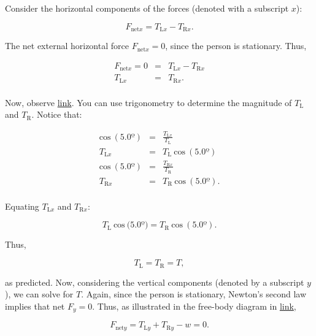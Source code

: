 \documentclass[
]{book}
\begin{document}
Consider the horizontal components of the forces (denoted with a
subscript \(x{}\)):

\leavevmode{}%
\[{F_{\text{net}x} = {T_{\text{L}x} - T_{\text{R}x}}}.\]

The net external horizontal force \({F_{\text{net}x} = 0}{}\), since the
person is stationary. Thus,

\leavevmode{}%
\[\begin{array}{lll}
{F_{\text{net}x} = 0} & = & {T_{\text{L}x} - T_{\text{R}x}} \\
T_{\text{L}x} & = & {T_{\text{R}x}.} \\
\end{array}{}\]

Now, observe \protect\hyperlink{import-auto-id1561864}{link}. You
can use trigonometry to determine the magnitude of \(T_{\text{L}}{}\) and
\(T_{\text{R}}{}\). Notice that:

\leavevmode{}%
\[\begin{array}{lll}
{\text{cos}\ (5.0º)} & = & \frac{T_{\text{L}x}}{T_{\text{L}}} \\
T_{\text{L}x} & = & {T_{\text{L}}\ \text{cos}\ (5.0º)} \\
{\text{cos}\ (5.0º)} & = & \frac{T_{\text{R}x}}{T_{\text{R}}} \\
T_{\text{R}x} & = & {T_{\text{R}}\ \text{cos}\ (5.0º).} \\
\end{array}\]

Equating \(T_{\text{L}x}{}\) and \(T_{\text{R}x}{}\):

\leavevmode{}%
\[{T_{\text{L}}\ \text{cos}\ (5.0º{) = T_{\text{R}}}\ \text{cos}\ (5.0º)}.\]

Thus,

\leavevmode{}%
\[{{T_{\text{L}} = T_{\text{R}}} = T},\]

as predicted. Now, considering the vertical components (denoted by a
subscript \(y{}\)), we can solve for \(T{}\). Again, since the person is
stationary, Newton's second law implies that net \({F_{y} = 0}{}\). Thus,
as illustrated in the free-body diagram in
\protect\hyperlink{import-auto-id1561864}{link},

\leavevmode{}%
\[{{F_{\text{net}y} = {{T_{\text{L}y} + T_{\text{R}y}} - w}} = 0}.\]
\end{document}
